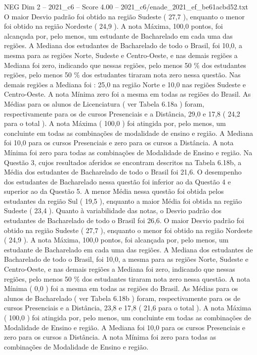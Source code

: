 \begin{textsample}{NEG Dim 2 – 2021\_c6 – Score 4.00 – 2021\_c6/enade\_2021\_ef\_be61acbd52.txt}
O maior Desvio padrão foi obtido na região Sudeste ( 27,7 ), enquanto o menor foi obtido na região Nordeste ( 24,9 ).
A nota Máxima, 100,0 pontos, foi alcançada por, pelo menos, um estudante de Bacharelado em cada uma das regiões.
A Mediana dos estudantes de Bacharelado de todo o Brasil, foi 10,0, a mesma para as regiões Norte, Sudeste e Centro-Oeste, e nas demais regiões a Mediana foi zero, indicando que nessas regiões, pelo menos 50 \% dos estudantes regiões, pelo menos 50 \% dos estudantes tiraram nota zero nessa questão.
Nas demais regiões a Mediana foi : 25,0 na região Norte e 10,0 nas regiões Sudeste e Centro-Oeste.
A nota Mínima zero foi a mesma em todas as regiões do Brasil.
As Médias para os alunos de Licenciatura ( ver Tabela 6.18a ) foram, respectivamente para os de cursos Presenciais e a Distância, 29,0 e 17,8 ( 24,2 para o total ).
A nota Máxima ( 100,0 ) foi atingida por, pelo menos, um concluinte em todas as combinações de modalidade de ensino e região.
A Mediana foi 10,0 para os cursos Presenciais e zero para os cursos a Distância.
A nota Mínima foi zero para todas as combinações de Modalidade de Ensino e região.
Na Questão 3, cujos resultados aferidos se encontram descritos na Tabela 6.18b, a Média dos estudantes de Bacharelado de todo o Brasil foi 21,6.
O desempenho dos estudantes de Bacharelado nessa questão foi inferior ao da Questão 4 e superior ao da Questão 5.
A menor Média nessa questão foi obtida pelos estudantes da região Sul ( 19,5 ), enquanto a maior Média foi obtida na região Sudeste ( 23,4 ).
Quanto à variabilidade das notas, o Desvio padrão dos estudantes de Bacharelado de todo o Brasil foi 26,6.
O maior Desvio padrão foi obtido na região Sudeste ( 27,7 ), enquanto o menor foi obtido na região Nordeste ( 24,9 ).
A nota Máxima, 100,0 pontos, foi alcançada por, pelo menos, um estudante de Bacharelado em cada uma das regiões.
A Mediana dos estudantes de Bacharelado de todo o Brasil, foi 10,0, a mesma para as regiões Norte, Sudeste e Centro-Oeste, e nas demais regiões a Mediana foi zero, indicando que nessas regiões, pelo menos 50 \% dos estudantes tiraram nota zero nessa questão.
A nota Mínima ( 0,0 ) foi a mesma em todas as regiões do Brasil.
As Médias para os alunos de Bacharelado ( ver Tabela 6.18b ) foram, respectivamente para os de cursos Presenciais e a Distância, 23,8 e 17,8 ( 21,6 para o total ).
A nota Máxima ( 100,0 ) foi atingida por, pelo menos, um concluinte em todas as combinações de Modalidade de Ensino e região.
A Mediana foi 10,0 para os cursos Presenciais e zero para os cursos a Distância.
A nota Mínima foi zero para todas as combinações de Modalidade de Ensino e região.

\end{textsample}
